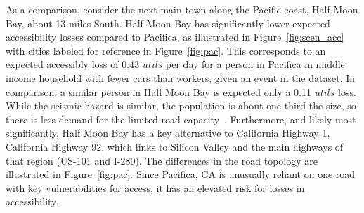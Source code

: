 As a comparison, consider the next main town along the Pacific coast, Half Moon Bay, about 13 miles South. Half Moon Bay has significantly lower expected accessibility losses compared to Pacifica, as illustrated in Figure~\ref{fig:scen_acc} with cities labeled for reference in Figure~\ref{fig:pac}. 
This corresponds to an expected accessibly loss of 0.43 $utils$ per day for a person in Pacifica in middle income household with fewer cars than workers, given an event in the dataset. In comparison, a similar person in Half Moon Bay is expected only a 0.11 $utils$ loss.
While the seismic hazard is similar, the population is about one third the size, so there is less demand for the limited road capacity~\cite{u.s._bureau_of_the_census_united_2010}. Furthermore, and likely most significantly, Half Moon Bay has a key alternative to California Highway 1, California Highway 92, which links to Silicon Valley and the main highways of that region (US-101 and I-280). The differences in the road topology are illustrated in Figure~\ref{fig:pac}. Since Pacifica, CA is unusually reliant on one road with key vulnerabilities for access, it has an elevated risk for losses in accessibility.




